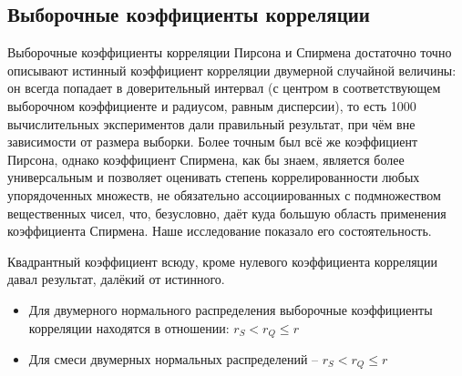 \subsection{Выборочные коэффициенты корреляции}

Выборочные коэффициенты корреляции Пирсона и Спирмена достаточно точно описывают истинный коэффициент корреляции двумерной случайной величины: он всегда попадает в доверительный интервал (с центром в соответствующем выборочном коэффициенте и радиусом, равным дисперсии), то есть 1000 вычислительных экспериментов дали правильный результат, при чём вне зависимости от размера выборки. Более точным был всё же коэффициент Пирсона, однако коэффициент Спирмена, как бы знаем, является более универсальным и позволяет оценивать степень коррелированности любых упорядоченных множеств, не обязательно ассоциированных с подмножеством вещественных чисел, что, безусловно, даёт куда большую область применения коэффициента Спирмена. Наше исследование показало его состоятельность.

Квадрантный коэффициент всюду, кроме нулевого коэффициента корреляции давал результат, далёкий от истинного.

\begin{itemize}
\item Для двумерного нормального распределения выборочные коэффициенты корреляции находятся в отношении: $r_S < r_Q \leq r$

\item Для смеси двумерных нормальных распределений -- $r_S < r_Q \leq r$

\end{itemize}
